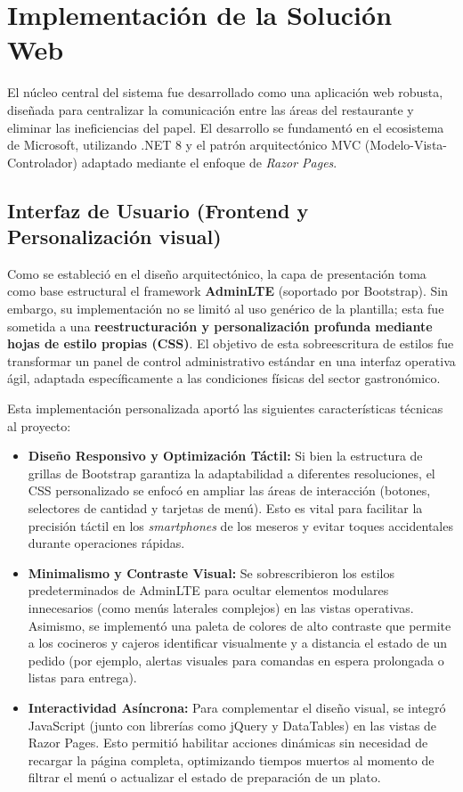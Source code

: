 \section{Implementación de la Solución Web}

El núcleo central del sistema fue desarrollado como una aplicación web robusta, diseñada para centralizar la comunicación entre las áreas del restaurante y eliminar las ineficiencias del papel. El desarrollo se fundamentó en el ecosistema de Microsoft, utilizando .NET 8 y el patrón arquitectónico MVC (Modelo-Vista-Controlador) adaptado mediante el enfoque de \textit{Razor Pages}.

\subsection{Interfaz de Usuario (Frontend y Personalización visual)}

Como se estableció en el diseño arquitectónico, la capa de presentación toma como base estructural el framework \textbf{AdminLTE} (soportado por Bootstrap). Sin embargo, su implementación no se limitó al uso genérico de la plantilla; esta fue sometida a una \textbf{reestructuración y personalización profunda mediante hojas de estilo propias (CSS)}. El objetivo de esta sobreescritura de estilos fue transformar un panel de control administrativo estándar en una interfaz operativa ágil, adaptada específicamente a las condiciones físicas del sector gastronómico.

Esta implementación personalizada aportó las siguientes características técnicas al proyecto:

\begin{itemize}
	\item \textbf{Diseño Responsivo y Optimización Táctil:} Si bien la estructura de grillas de Bootstrap garantiza la adaptabilidad a diferentes resoluciones, el CSS personalizado se enfocó en ampliar las áreas de interacción (botones, selectores de cantidad y tarjetas de menú). Esto es vital para facilitar la precisión táctil en los \textit{smartphones} de los meseros y evitar toques accidentales durante operaciones rápidas.
	\item \textbf{Minimalismo y Contraste Visual:} Se sobrescribieron los estilos predeterminados de AdminLTE para ocultar elementos modulares innecesarios (como menús laterales complejos) en las vistas operativas. Asimismo, se implementó una paleta de colores de alto contraste que permite a los cocineros y cajeros identificar visualmente y a distancia el estado de un pedido (por ejemplo, alertas visuales para comandas en espera prolongada o listas para entrega).
	\item \textbf{Interactividad Asíncrona:} Para complementar el diseño visual, se integró JavaScript (junto con librerías como jQuery y DataTables) en las vistas de Razor Pages. Esto permitió habilitar acciones dinámicas sin necesidad de recargar la página completa, optimizando tiempos muertos al momento de filtrar el menú o actualizar el estado de preparación de un plato.
\end{itemize}


